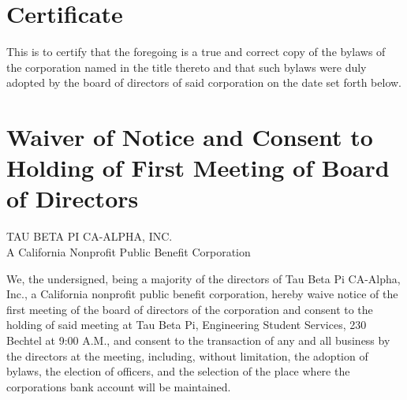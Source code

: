 \documentclass{article}
\begin{document}
	\vspace{1 cm}
	\noindent \makebox[\textwidth][l]{
		\makebox[9cm][l] {\hrulefill} \hfill 
		\makebox[5cm][l] {\hrulefill} 
	}
	\noindent {}
	
	\vspace{1 cm}
	\noindent \makebox[\textwidth][l]{
		\makebox[9cm][l] {\hrulefill} \hfill 
		\makebox[5cm][l] {\hrulefill} 
	}
	\noindent {}
	
	\vspace{1cm}
	\noindent \makebox[\textwidth][l]{
		\makebox[9cm][l] {\hrulefill} \hfill 
		\makebox[5cm][l] {\hrulefill} 
	}
	\noindent {}
	\pagebreak
	\section*{Certificate}
	This is to certify that the foregoing is a true and correct copy of the bylaws of the corporation named in the title thereto and that such bylaws were duly adopted by the board of directors of said corporation on the date set forth below.
	
	\vspace{1cm}
	\noindent \makebox[\textwidth][l]{
		\makebox[9cm][l] {\hrulefill} \hfill 
		\makebox[5cm][l] {\hrulefill} 
	}
	\noindent {}
	
	\pagebreak
	\section*{Waiver of Notice and Consent to Holding of First Meeting of Board of Directors}
		\begin{large}
			\uppercase{Tau Beta Pi CA-Alpha, Inc.} \\
			A California Nonprofit Public Benefit Corporation\\
		\end{large} 
		
		\noindent We, the undersigned, being a majority of the directors of Tau Beta Pi CA-Alpha, Inc., a California nonprofit public benefit corporation, hereby waive notice of the first meeting of the board of directors of the corporation and consent to the holding of said meeting at Tau Beta Pi, Engineering Student Services, 230 Bechtel at 9:00 A.M., and consent to the transaction of any and all business by the directors at the meeting, including, without limitation, the adoption of bylaws, the election of officers, and the selection of the place where the corporation\textquotesingle s bank account will be maintained.
	
\end{document}
